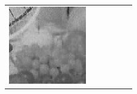 \documentclass[11pt,a4paper,openright,oneside]{book}
\numberwithin{equation}{section}
\begin{document}
{\begin{figure}[h]
\begin{adjustwidth}{-3cm}{-3cm}
\begin{tabular}{>{\centering\arraybackslash}m{1.5cm} m{2.5cm} m{2.5cm} m{2.5cm} m{2.5cm} m{2.5cm}}
        \includegraphics[width=\linewidth]{media/tnale/AAAfruits-comp5-ale-8.png} \\
        

\end{tabular}
\end{adjustwidth}
\end{figure}}
\end{document}
